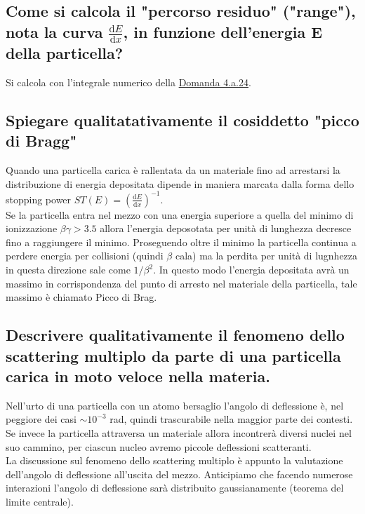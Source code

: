 \subsection[\hspace{1mm} ]{Come si calcola il "percorso residuo" ("range"), nota la curva $\frac{\mbox{d} E}{\mbox{d} x}$, in funzione dell'energia E della particella?
}\label{sec:4.a.26}
Si calcola con l'integrale numerico della \hyperref[sec:4.a.24]{Domanda 4.a.24}.

\subsection[\hspace{1mm} ]{Spiegare qualitatativamente il cosiddetto "picco di Bragg"
}\label{sec:4.a.27}
Quando una particella carica è rallentata da un materiale fino ad arrestarsi la distribuzione di energia depositata dipende in maniera marcata dalla forma dello stopping power $ST\left( E \right) = \left( \frac{\mbox{d} E}{\mbox{d} x}  \right)^{-1}$.\\
Se la particella entra nel mezzo con una energia superiore a quella del minimo di ionizzazione $\beta \gamma > 3.5$ allora l'energia deposotata per unità di lunghezza decresce fino a raggiungere il minimo. Proseguendo oltre il minimo la particella continua a perdere energia per collisioni (quindi $\beta$ cala) ma la perdita per unità di lugnhezza in questa direzione sale come $1 /\beta^2$. In questo modo l'energia depositata avrà un massimo in corrispondenza del punto di arresto nel materiale della particella, tale massimo è chiamato Picco di Brag.

\subsection[\hspace{1mm} ]{Descrivere qualitativamente il fenomeno dello scattering multiplo da parte di una particella carica in moto veloce nella materia.
}\label{sec:4.a.28}
Nell'urto di una particella con un atomo bersaglio l'angolo di deflessione è, nel peggiore dei casi $\sim 10^{-3}$ rad, quindi trascurabile nella maggior parte dei contesti. Se invece la particella attraversa un materiale allora incontrerà diversi nuclei nel suo cammino, per ciascun nucleo avremo piccole deflessioni scatteranti.\\
La discussione sul fenomeno dello scattering multiplo è appunto la valutazione dell'angolo di deflessione all'uscita del mezzo. Anticipiamo che facendo numerose interazioni l'angolo di deflessione sarà distribuito gaussianamente (teorema del limite centrale). 

